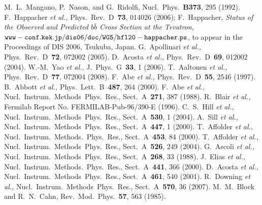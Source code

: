  \begin{thebibliography}{99}
 \label{bibliography}

     M.~L.~Mangano, P.~Nason, and G.~Ridolfi, 
                  Nucl.~Phys.~{\bf B373}, 295 (1992).
 F.~Happacher {\it et al.,} Phys.~Rev.~D~{\bf 73}, 014026
                  (2006); 
                  F.~Happacher, {\it Status of the Observed and Predicted
                  $b \bar{b}$ Cross Section at the Tevatron},
                  $\tt www-conf.kek.jp/dis06/doc/WG5/hfl20-happacher.ps$,
                  to appear in the Proceedings of DIS 2006, Tsukuba, Japan.
    G.~Apollinari {\it et al.,} Phys.~Rev.~D~{\bf 72}, 072002
                  (2005). 
    D.~Acosta {\it et al.,} Phys.~Rev.~D~{\bf 69}, 012002 (2004).
     W.-M.~Yao {\it et al.,} J.~Phys.~G~{\bf 33}, 1 (2006).
    T.~Aaltonen {\it et al.,} Phys.~Rev.~D~{\bf 77}, 072004
                  (2008). %
  F.~Abe {\it et al.,} Phys.~Rev.~D~{\bf 55}, 2546 (1997).
    B.~Abbott {\it et al.,} Phys.~Lett.~B~{\bf 487}, 264 (2000).
    F.~Abe {\it et al.,} Nucl.~Instrum.~Methods~Phys.~Res.,
                  Sect.~A~{\bf 271}, 387 (1988).
    R.~Blair {\it et al.,} Fermilab Report No.
                  FERMILAB-Pub-96/390-E (1996).
  C.~S.~Hill {\it et al.,} Nucl.~Instrum.~Methods~Phys.~Res.,
                  Sect.~A~{\bf 530}, 1 (2004).
    A.~Sill {\it et al.,} Nucl.~Instrum.~Methods~Phys.~Res.,
                  Sect.~A~{\bf 447}, 1 (2000).
  T.~Affolder {\it et al.,} Nucl.~Instrum.~Methods.~Phys.~Res.,
                  Sect.~A~{\bf 453}, 84 (2000).
    T.~Affolder {\it et al.,} Nucl.~Instrum.~Methods~Phys.~Res.,
                  Sect.~A~{\bf 526}, 249 (2004).
    G.~Ascoli {\it et al.,} Nucl.~Instrum.~Methods~Phys.~Res., 
                  Sect.~A~{\bf 268}, 33 (1988).
    J.~Elias {\it et al.,} Nucl.~Instrum.~Methods.~Phys.~Res.,
                  Sect.~A~{\bf 441}, 366 (2000).
    D.~Acosta {\it et al.,} Nucl.~Instrum.~Methods~Phys.~Res., 
                  Sect.~A~{\bf 461}, 540 (2001).
    R.~Downing {\it et al.,} Nucl.~Instrum.~Methods~Phys.~Res., 
                  Sect.~A~{\bf 570}, 36 (2007).
 M.~M.~Block and R.~N.~Cahn, Rev.~Mod.~Phys.~{\bf 57}, 563
                  (1985).

\end{thebibliography}
